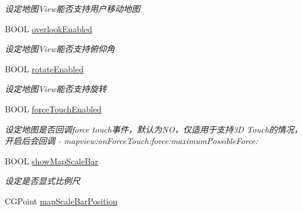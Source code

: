 \begin{DoxyCompactItemize}
\begin{DoxyCompactList}\small\item\em 设定地图\+View能否支持用户移动地图 \end{DoxyCompactList}\item 
\hypertarget{interface_b_m_k_map_view_a8ab1315eb7dadb7db33f2ac568340dec}{}B\+O\+O\+L \hyperlink{interface_b_m_k_map_view_a8ab1315eb7dadb7db33f2ac568340dec}{overlook\+Enabled}\label{interface_b_m_k_map_view_a8ab1315eb7dadb7db33f2ac568340dec}

\begin{DoxyCompactList}\small\item\em 设定地图\+View能否支持俯仰角 \end{DoxyCompactList}\item 
\hypertarget{interface_b_m_k_map_view_acfd7b4dc9bb05e46ffe477b527c61ce0}{}B\+O\+O\+L \hyperlink{interface_b_m_k_map_view_acfd7b4dc9bb05e46ffe477b527c61ce0}{rotate\+Enabled}\label{interface_b_m_k_map_view_acfd7b4dc9bb05e46ffe477b527c61ce0}

\begin{DoxyCompactList}\small\item\em 设定地图\+View能否支持旋转 \end{DoxyCompactList}\item 
\hypertarget{interface_b_m_k_map_view_ae565d1d783ef036f658da5c8e7a45f6f}{}B\+O\+O\+L \hyperlink{interface_b_m_k_map_view_ae565d1d783ef036f658da5c8e7a45f6f}{force\+Touch\+Enabled}\label{interface_b_m_k_map_view_ae565d1d783ef036f658da5c8e7a45f6f}

\begin{DoxyCompactList}\small\item\em 设定地图是否回调force touch事件，默认为\+N\+O，仅适用于支持3\+D Touch的情况，开启后会回调 -\/ mapview\+:on\+Force\+Touch\+:force\+:maximum\+Possible\+Force\+: \end{DoxyCompactList}\item 
\hypertarget{interface_b_m_k_map_view_ad8768aef899c970e88a4cba6f4f7a1bd}{}B\+O\+O\+L \hyperlink{interface_b_m_k_map_view_ad8768aef899c970e88a4cba6f4f7a1bd}{show\+Map\+Scale\+Bar}\label{interface_b_m_k_map_view_ad8768aef899c970e88a4cba6f4f7a1bd}

\begin{DoxyCompactList}\small\item\em 设定是否显式比例尺 \end{DoxyCompactList}\item 
\hypertarget{interface_b_m_k_map_view_a5eeee2f88682636f7e6f891246b03730}{}C\+G\+Point \hyperlink{interface_b_m_k_map_view_a5eeee2f88682636f7e6f891246b03730}{map\+Scale\+Bar\+Position}\label{interface_b_m_k_map_view_a5eeee2f88682636f7e6f891246b03730}


\end{DoxyCompactItemize}
